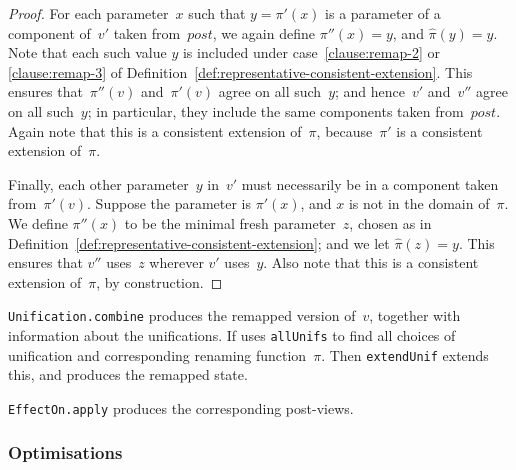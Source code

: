 \begin{proof}
For each parameter~$x$ such that $y = \pi'(x)$ is a parameter of a component
of~$v'$ taken from~$post$, we again define $\pi''(x) = y$, and $\hat\pi(y) =
y$.  Note that each such value $y$ is included under
case~\ref{clause:remap-2} or \ref{clause:remap-3} of
Definition~\ref{def:representative-consistent-extension}.  This ensures
that~$\pi''(v)$ and~$\pi'(v)$ agree on all such~$y$; and hence~$v'$ and~$v''$
agree on all such~$y$; in particular, they include the same components taken
from~$post$.  Again note that this is a consistent extension of~$\pi$,
because~$\pi'$ is a consistent extension of~$\pi$. 

Finally, each other parameter~$y$ in~$v'$ must necessarily be in a component
taken from~$\pi'(v)$.  Suppose the parameter is $\pi'(x)$, and $x$ is not in
the domain of~$\pi$.  We define $\pi''(x)$ to be the minimal fresh
parameter~$z$, chosen as in
Definition~\ref{def:representative-consistent-extension}; and we let
$\hat\pi(z) = y$.  This ensures that $v''$ uses~$z$ wherever $v'$ uses~$y$.
Also note that this is a consistent extension of~$\pi$, by construction.
\end{proof}


\begin{impNote}
\texttt{Unification.combine} produces the remapped version of~$v$, together
with information about the unifications.  If uses \texttt{allUnifs} to find
all choices of unification and corresponding renaming function~$\pi$.  Then
\texttt{extendUnif} extends this, and produces the remapped state.

\texttt{EffectOn.apply} produces the corresponding post-views.
\end{impNote}


\subsubsection{Optimisations} 



